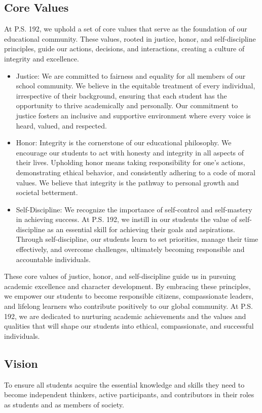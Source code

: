 \documentclass[11pt, letterpaper]{article}
\begin{document}
\subsection{Core Values}
At P.S. 192, we uphold a set of core values that serve as the foundation of our educational community. These values, rooted in justice, honor, and self-discipline principles, guide our actions, decisions, and interactions, creating a culture of integrity and excellence.
\begin{itemize}
\item Justice: We are committed to fairness and equality for all members of our school community. We believe in the equitable treatment of every 
individual, irrespective of their background, ensuring that each student has the opportunity to thrive academically and personally. Our commitment to 
justice fosters an inclusive and supportive environment where every voice is heard, valued, and respected.
\item Honor: Integrity is the cornerstone of our educational philosophy. We encourage our students to act with honesty and integrity in all aspects of their lives. Upholding honor means taking responsibility for one's actions, demonstrating ethical behavior, and consistently adhering to a code of moral values. We believe that integrity is the pathway to personal growth and societal betterment.
\item Self-Discipline: We recognize the importance of self-control and self-mastery in achieving success. At P.S. 192, we instill in our students the value of self-discipline as an essential skill for achieving their goals and aspirations. Through self-discipline, our students learn to set priorities, manage their time effectively, and overcome challenges, ultimately becoming responsible and accountable individuals.
\end{itemize}
These core values of justice, honor, and self-discipline guide us in pursuing academic excellence and character development. By embracing these principles, we empower our students to become responsible citizens, compassionate leaders, and lifelong learners who contribute positively to our global community. At P.S. 192, we are dedicated to nurturing academic achievements and the values and qualities that will shape our students into ethical, compassionate, and successful individuals.

\subsection{Vision}
To ensure all students acquire the essential knowledge and skills they need to become independent thinkers, active participants, and contributors in their roles as students and as members of society.
\end{document}
